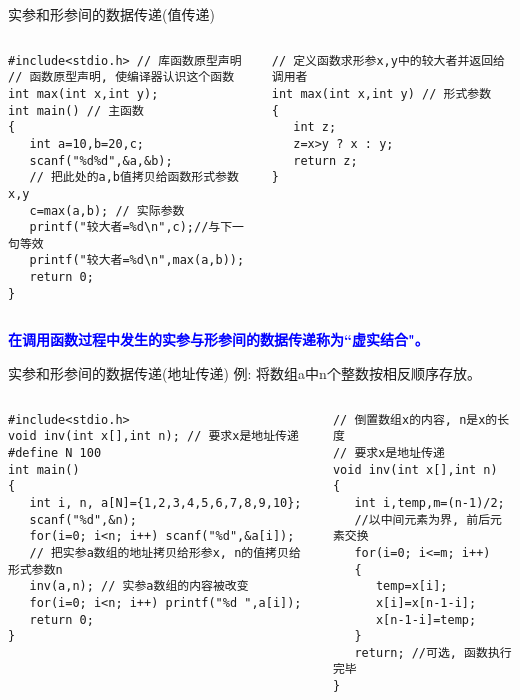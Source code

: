 \begin{frame}{实参和形参间的数据传递(值传递)}
\vspace{-0.3cm}
\begin{columns}[T]
\begin{lstlisting}
#include<stdio.h> // 库函数原型声明
// 函数原型声明, 使编译器认识这个函数
int max(int x,int y); 
int main() // 主函数
{
   int a=10,b=20,c;
   scanf("%d%d",&a,&b);
   // 把此处的a,b值拷贝给函数形式参数x,y
   c=max(a,b); // 实际参数 
   printf("较大者=%d\n",c);//与下一句等效
   printf("较大者=%d\n",max(a,b));
   return 0; 
}
\end{lstlisting}
\begin{lstlisting}[frame=leftline]
// 定义函数求形参x,y中的较大者并返回给调用者
int max(int x,int y) // 形式参数
{  
   int z;
   z=x>y ? x : y;
   return z; 
}
\end{lstlisting}
\end{columns}
\textbf{\textcolor{blue}{在调用函数过程中发生的实参与形参间的数据传递称为``虚实结合"。}}
\end{frame}

\begin{frame}{实参和形参间的数据传递(地址传递)}
例: 将数组a中n个整数按相反顺序存放。
\begin{columns}[T]
\begin{lstlisting}
#include<stdio.h> 
void inv(int x[],int n); // 要求x是地址传递
#define N 100 
int main() 
{
   int i, n, a[N]={1,2,3,4,5,6,7,8,9,10};
   scanf("%d",&n);
   for(i=0; i<n; i++) scanf("%d",&a[i]);
   // 把实参a数组的地址拷贝给形参x, n的值拷贝给形式参数n
   inv(a,n); // 实参a数组的内容被改变
   for(i=0; i<n; i++) printf("%d ",a[i]);
   return 0; 
}
\end{lstlisting}
\begin{lstlisting}[frame=leftline]
// 倒置数组x的内容, n是x的长度
// 要求x是地址传递
void inv(int x[],int n) 
{  
   int i,temp,m=(n-1)/2;
   //以中间元素为界, 前后元素交换
   for(i=0; i<=m; i++) 
   {
      temp=x[i]; 
      x[i]=x[n-1-i]; 
      x[n-1-i]=temp;
   }
   return; //可选, 函数执行完毕
}
\end{lstlisting}
\end{columns}
~\\
\end{frame}

